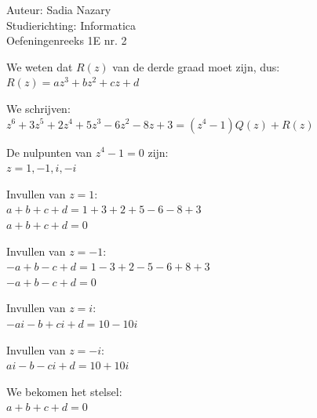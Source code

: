 \documentclass[a4paper]{article}
\begin{document}
  
\noindent \large Auteur: Sadia Nazary  \\
\noindent \large Studierichting: Informatica\\
\noindent \large Oefeningenreeks 1E nr. 2\\

\medskip

\normalsize

We weten dat $R(z)$ van de derde graad moet zijn, dus: \\

$R(z)=az^3+bz^2+cz+d$ \\

\medskip

We schrijven: \\

$z^6+3z^5+2z^4+5z^3-6z^2-8z+3=(z^4-1)Q(z)+R(z)$ \\

\medskip

De nulpunten van $z^4-1=0$ zijn: \\

$z=1,-1,i,-i$ \\

\medskip

Invullen van $z=1$: \\

$a+b+c+d=1+3+2+5-6-8+3$ \\

$a+b+c+d=0$ \\

\medskip

Invullen van $z=-1$: \\

$-a+b-c+d=1-3+2-5-6+8+3$ \\

$-a+b-c+d=0$ \\

\medskip

Invullen van $z=i$: \\

$-ai-b+ci+d=10-10i$ \\

\medskip

Invullen van $z=-i$: \\

$ai-b-ci+d=10+10i$ \\

\medskip

We bekomen het stelsel: \\

$a+b+c+d=0$ \\
\end{document}
